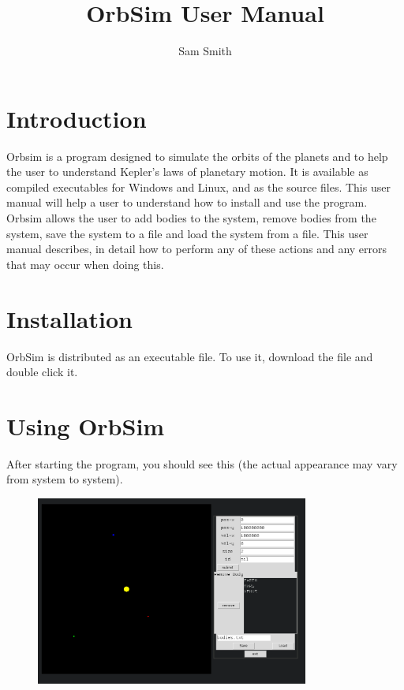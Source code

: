 \documentclass[a4paper,11pt,titlepage]{article}
\author{Sam Smith}
\title{OrbSim User Manual}
\date{}
\begin{document}
\maketitle
\tableofcontents
\clearpage

\section{Introduction}
Orbsim is a program designed to simulate the orbits of the planets and to help
the user to understand Kepler's laws of planetary motion. It is available as
compiled executables for Windows and Linux, and as the source files. This user
manual will help a user to understand how to install and use the program. \\

Orbsim allows the user to add bodies to the system, remove bodies from the
system, save the system to a file and load the system from a file. This user
manual describes, in detail how to perform any of these actions and any errors
that may occur when doing this.

\section{Installation}
OrbSim is distributed as an executable file. To use it, download the file and
double click it.

\section{Using OrbSim}

After starting the program, you should see this (the actual appearance may vary
from system to system).
\begin{figure}[H]
	\centering
	\includegraphics[width=0.8\textwidth]{../img/start.png}
\end{figure}
\end{document}
